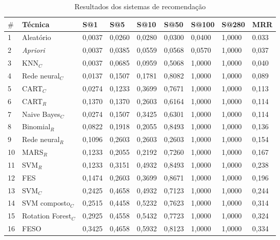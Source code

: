 \documentclass[10pt]{article}
\begin{document}
\begin{table}[!htp]
	\centering
	\caption{Resultados dos sistemas de recomendação}
	\begin{tabular}{|l|l|l|l|l|l|l|l|l|} \hline
		\textbf{\(\mathbf{\#}\)} & \textbf{Técnica}&\textbf{S@1}&\textbf{S@5} & \textbf{S@10} & \textbf{S@50} & \textbf{S@100} & \textbf{S@280} & \textbf{MRR} \\ \hline
		
		1  & Aleatório				& 0,0037 & 0,0260 & 0,0280 & 0,0300 & 0,0400 & 1,0000 & 0.033 \\ \hline
		2  & \emph{Apriori}			& 0,0037 & 0,0385 & 0,0559 & 0,0568 & 0,0570 & 1,0000 & 0,037 \\ \hline
		3  & KNN\(_C\)				& 0,0037 & 0,0685 & 0,0959 & 0,5068 & 1,0000 & 1,0000 & 0,040 \\ \hline
		4  & Rede neural\(_C\)		& 0,0137 & 0,1507 & 0,1781 & 0,8082 & 1,0000 & 1,0000 & 0,089 \\ \hline
		5  & CART\(_C\)				& 0,0274 & 0,1233 & 0,3699 & 0,7671 & 1,0000 & 1,0000 & 0,113 \\ \hline
		6  & CART\(_R\)    			& 0,1370 & 0,1370 & 0,2603 & 0,6164 & 1,0000 & 1,0000 & 0,114 \\ \hline
		7  & Naive Bayes\(_C\)     	& 0,0274 & 0,1507 & 0,3425 & 0,6301 & 1,0000 & 1,0000 & 0,114 \\ \hline
		8  & Binomial\(_R\) 		& 0,0822 & 0,1918 & 0,2055 & 0,8493 & 1,0000 & 1,0000 & 0,136 \\ \hline
		9  & Rede neural\(_R\)     	& 0,1096 & 0,2603 & 0,2603 & 0,2603 & 1,0000 & 1,0000 & 0,154 \\ \hline
		10 & MARS\(_R\)     		& 0,1233 & 0,2055 & 0,2192 & 0,7260 & 1,0000 & 1,0000 & 0,167 \\ \hline
		11 & SVM\(_R\)     			& 0,1233 & 0,3151 & 0,4932 & 0,8493 & 1,0000 & 1,0000 & 0,238 \\ \hline
		12 & FES           			& 0,1474 & 0,2603 & 0,3699 & 0,8671 & 1,0000 & 1,0000 & 0,196 \\ \hline
		13 & SVM\(_C\)    			& 0,2425 & 0,4658 & 0,4932 & 0,7123 & 1,0000 & 1,0000 & 0,244 \\ \hline
		14 & SVM composto\(_C\)		& 0,2515 & 0,4458 & 0,5232 & 0,7623 & 1,0000 & 1,0000 & 0,314 \\ \hline
		15 & Rotation Forest\(_C\)  & 0,2925 & 0,4558 & 0,5432 & 0,7723 & 1,0000 & 1,0000 & 0,324 \\ \hline
		16 & FESO          			& 0,3425 & 0,4658 & 0,5932 & 0,8123 & 1,0000 & 1,0000 & 0,334 \\ \hline
	\end{tabular}
	\label{tb_resultadosExperimentos}
	\vspace{0.1cm}
\end{table}
\egroup
\end{document}
